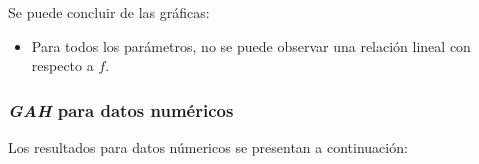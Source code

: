 \begin{figure}[H]
  \centering
  \label{fig:f_ga2}
\end{figure}

    Se puede concluir de las gráficas:
\begin{itemize}
    \item Para todos los parámetros, no se puede observar una
relación lineal con respecto a $f$.
\end{itemize}

\subsubsection{\emph{GAH} para datos numéricos}

    Los resultados para datos númericos se presentan a continuación:

